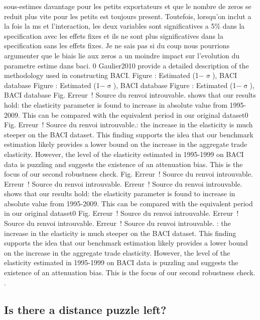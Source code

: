 \documentclass[12pt,twoside,a4paper,notitlepage]{article}
\begin{document}
{sous-estimes davantage pour les petits exportateurs et que le nombre de zeros se reduit plus vite pour les petits est toujours present. Toutefois, lorsqu'on inclut a la fois la ms et l'interaction, les deux variables sont significatives a 5\% dans la specification avec les effets fixes et ils ne sont plus significatives dans la specification sans les effets fixes. Je ne sais pas si du coup nous pourrions argumenter que le biais lie aux zeros a un moindre impact sur l'evolution du parametre estime dans baci. 0 Gaulier2010 provide a detailed description of the methodology used in constructing BACI. Figure : Estimated (1${-}$${\upsigma}$), BACI database Figure : Estimated (1${-}$${\upsigma}$), BACI database Figure : Estimated (1${-}$${\upsigma}$), BACI database Fig. Erreur~! Source du renvoi introuvable. shows that our results hold: the elasticity parameter is found to increase in absolute value from 1995-2009. This can be compared with the equivalent period in our original dataset0 Fig. Erreur~! Source du renvoi introuvable.: the increase in the elasticity is much steeper on the BACI dataset. This finding supports the idea that our benchmark estimation likely provides a lower bound on the increase in the aggregate trade elasticity. However, the level of the elasticity estimated in 1995-1999 on BACI data is puzzling and suggests the existence of an attenuation bias. This is the focus of our second robustness check. Fig. Erreur~! Source du renvoi introuvable. Erreur~! Source du renvoi introuvable. Erreur~! Source du renvoi introuvable. shows that our results hold: the elasticity parameter is found to increase in absolute value from 1995-2009. This can be compared with the equivalent period in our original dataset0 Fig. Erreur~! Source du renvoi introuvable. Erreur~! Source du renvoi introuvable. Erreur~! Source du renvoi introuvable. : the increase in the elasticity is much steeper on the BACI dataset. This finding supports the idea that our benchmark estimation likely provides a lower bound on the increase in the aggregate trade elasticity. However, the level of the elasticity estimated in 1995-1999 on BACI data is puzzling and suggests the existence of an attenuation bias. This is the focus of our second robustness check. 
 . 

\subsection{ Is there a distance puzzle left? \label{mark-2.4.}}

}
\end{document}
